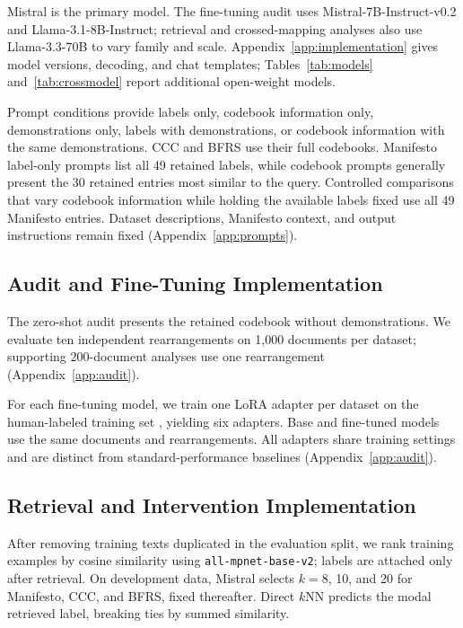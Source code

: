 \documentclass[11pt]{article}
\begin{document}
Mistral is the primary model. The fine-tuning audit uses Mistral-7B-Instruct-v0.2 and Llama-3.1-8B-Instruct; retrieval and crossed-mapping analyses also use Llama-3.3-70B to vary family and scale. Appendix~\ref{app:implementation} gives model versions, decoding, and chat templates; Tables~\ref{tab:models} and~\ref{tab:crossmodel} report additional open-weight models.

Prompt conditions provide labels only, codebook information only, demonstrations only, labels with demonstrations, or codebook information with the same demonstrations. CCC and BFRS use their full codebooks. Manifesto label-only prompts list all 49 retained labels, while codebook prompts generally present the 30 retained entries most similar to the query. Controlled comparisons that vary codebook information while holding the available labels fixed use all 49 Manifesto entries. Dataset descriptions, Manifesto context, and output instructions remain fixed (Appendix~\ref{app:prompts}).



\subsection{Audit and Fine-Tuning Implementation}
\label{sec:m-audit-setup}

The zero-shot audit presents the retained codebook without demonstrations. We evaluate ten independent rearrangements on 1,000 documents per dataset; supporting 200-document analyses use one rearrangement (Appendix~\ref{app:audit}).

For each fine-tuning model, we train one LoRA adapter per dataset on the human-labeled training set \citep{hu2022lora}, yielding six adapters. Base and fine-tuned models use the same documents and rearrangements. All adapters share training settings and are distinct from standard-performance baselines (Appendix~\ref{app:audit}).

\subsection{Retrieval and Intervention Implementation}
\label{sec:m-retrieval-setup}

After removing training texts duplicated in the evaluation split, we rank training examples by cosine similarity using \texttt{all-mpnet-base-v2}; labels are attached only after retrieval. On development data, Mistral selects \(k=8\), 10, and 20 for Manifesto, CCC, and BFRS, fixed thereafter. Direct \(k\)NN predicts the modal retrieved label, breaking ties by summed similarity.
\end{document}
